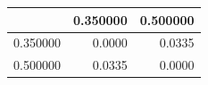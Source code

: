 \begin{tabular}{lrr}
\toprule
 & 0.350000 & 0.500000 \\
\midrule
0.350000 & 0.0000 & 0.0335 \\
0.500000 & 0.0335 & 0.0000 \\
\bottomrule
\end{tabular}
